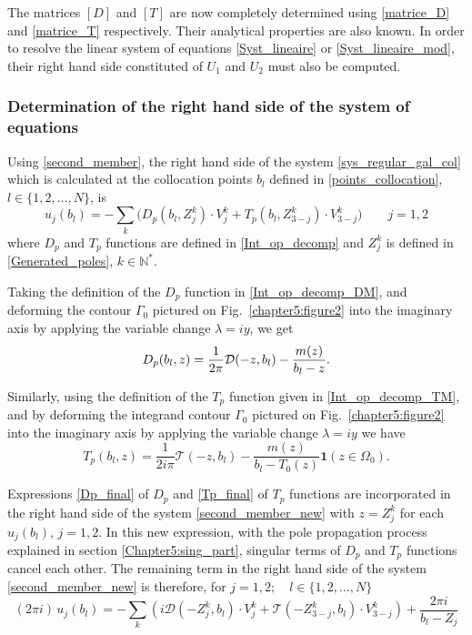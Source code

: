 The matrices $[D]$ and $[T]$ are now completely determined using \eqref{matrice_D} and \eqref{matrice_T} respectively. Their analytical properties are also known. In order to resolve the linear system of equations \eqref{Syst_lineaire} or \eqref{Syst_lineaire_mod},  their right hand side constituted of $U_1$ and $U_2$ must also be computed.

\subsubsection*{Determination of the right hand side of the system of equations}


Using \eqref{second_member}, the right hand side of the system \eqref{sys_regular_gal_col} which is calculated at the collocation points $b_l$ defined in \eqref{points_collocation}, $l \in \{ 1,2, \ldots, N \}$, is 
\begin{equation}
\label{second_member_new}
u_j(b_l) = -\sum_k \Big( D_p(b_l,Z_j^k)\cdot V_j^k+ T_p(b_l,Z_{3-j}^k)\cdot V_{3-j}^k\Big) \qquad j=1,2
\end{equation}
where $D_p$ and $T_p$ functions are defined in \eqref{Int_op_decomp} and $Z_j^k$ is defined in \eqref{Generated_poles}, $k \in \mathbb{N}^*$. 

Taking the definition of the $D_p$ function in \eqref{Int_op_decomp_DM}, and deforming the contour $\Gamma_0$ pictured on Fig.~\ref{chapter5:figure2} into the imaginary axis by applying the variable change $\lambda = iy$, we get
\begin{equation}
\label{Dp_final}
D_p(b_l,z) = {1\over 2\pi}\mathcal D(-z,b_l)-  {m(z)\over b_l-z}.
\end{equation}

Similarly, using the definition of the $T_p$ function given in \eqref{Int_op_decomp_TM}, and by deforming the integrand contour $\Gamma_0$ pictured on Fig.~\ref{chapter5:figure2} into the imaginary axis by applying the variable change $\lambda = iy$ we have
\begin{equation}
\label{Tp_final}
T_p(b_l,z) = 
\dfrac{1}{2i\pi} \mathcal T(-z,b_l) - \dfrac{m(z)}{b_l - T_0(z)} \mathbf{1} (z \in \Omega_0) .
\end{equation}

Expressions \eqref{Dp_final} of $D_p$ and \eqref{Tp_final} of $T_p$ functions are incorporated in the right hand side of the system \eqref{second_member_new} with $z = Z_j^k$ for each $u_j(b_l), \, j=1,2$. In this new expression, with the pole propagation process explained in section \ref{Chapter5:sing_part}, singular terms of $D_p$ and $T_p$ functions cancel each other. The remaining term in the right hand side of the system \eqref{second_member_new} is therefore, for $j=1,2; \quad l \in \{ 1,2, \ldots, N \}$
\begin{equation}
(2\pi i) \, u_j(b_l) =  - \sum_k \left( i \mathcal D(-Z_j^k,b_l)\cdot V_j^k  + \mathcal T(-Z_{3-j}^k,b_l) 
\cdot V_{3-j}^k  \right) +  \dfrac{2\pi i}{b_l - Z_j}
\end{equation}

